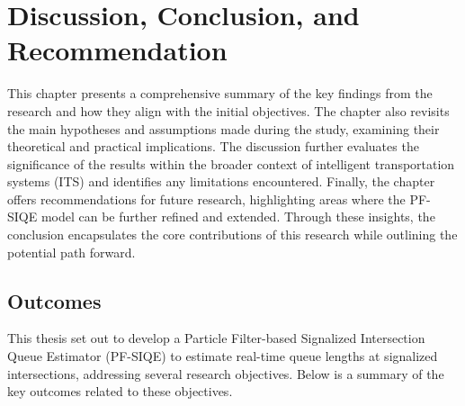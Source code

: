 \chapter{Discussion, Conclusion, and Recommendation}
\label{chapter: Discussion, Conclusion, and Recommendation}


This chapter presents a comprehensive summary of the key findings from the research and how they align with the initial objectives. The chapter also revisits the main hypotheses and assumptions made during the study, examining their theoretical and practical implications. The discussion further evaluates the significance of the results within the broader context of intelligent transportation systems (ITS) and identifies any limitations encountered. Finally, the chapter offers recommendations for future research, highlighting areas where the PF-SIQE model can be further refined and extended. Through these insights, the conclusion encapsulates the core contributions of this research while outlining the potential path forward.

\section{Outcomes}

This thesis set out to develop a Particle Filter-based Signalized Intersection Queue Estimator (PF-SIQE) to estimate real-time queue lengths at signalized intersections, addressing several research objectives. Below is a summary of the key outcomes related to these objectives.


